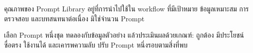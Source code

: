 \begin{keytakeaway}
คุณภาพของ Prompt Library อยู่ที่การนำไปใช้ใน workflow ที่มีเป้าหมาย ข้อมูลเหมาะสม การตรวจสอบ และบทสนทนาต่อเนื่อง มิใช่จำนวน Prompt
\end{keytakeaway}

\begin{reflection}
เลือก Prompt หนึ่งชุด ทดลองกับข้อมูลตัวอย่าง แล้วประเมินผลด้วยเกณฑ์: ถูกต้อง มีประโยชน์ ซื่อตรง ใช้งานได้ และเคารพความลับ ปรับ Prompt หนึ่งรอบตามสิ่งที่พบ
\blankline\blankline
\end{reflection}

